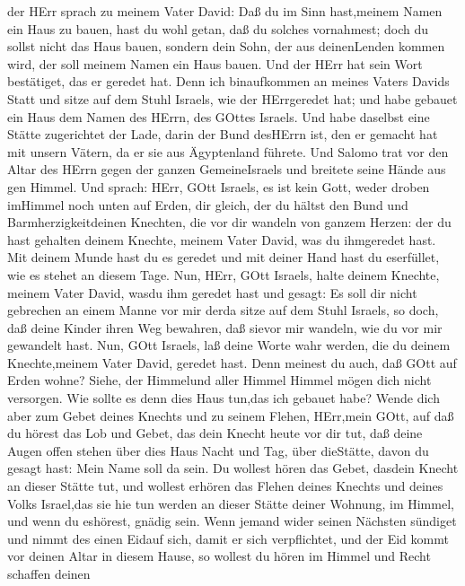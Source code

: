 der HErr sprach zu meinem Vater David: Daß du im Sinn hast,meinem Namen
ein Haus zu bauen, hast du wohl getan, daß du solches vornahmest;
 doch du sollst nicht das Haus bauen, sondern dein Sohn,
der aus deinenLenden kommen wird, der soll meinem Namen ein Haus bauen.
 Und der HErr hat sein Wort bestätiget, das er geredet hat.
Denn ich binaufkommen an meines Vaters Davids Statt und sitze auf dem
Stuhl Israels, wie der HErrgeredet hat; und habe gebauet ein Haus dem
Namen des HErrn, des GOttes Israels.  Und habe daselbst
eine Stätte zugerichtet der Lade, darin der Bund desHErrn ist, den er
gemacht hat mit unsern Vätern, da er sie aus Ägyptenland führete.
 Und Salomo trat vor den Altar des HErrn gegen der ganzen
GemeineIsraels und breitete seine Hände aus gen Himmel. 
Und sprach: HErr, GOtt Israels, es ist kein Gott, weder droben imHimmel
noch unten auf Erden, dir gleich, der du hältst den Bund und
Barmherzigkeitdeinen Knechten, die vor dir wandeln von ganzem Herzen:
 der du hast gehalten deinem Knechte, meinem Vater David,
was du ihmgeredet hast. Mit deinem Munde hast du es geredet und mit
deiner Hand hast du eserfüllet, wie es stehet an diesem Tage.
 Nun, HErr, GOtt Israels, halte deinem Knechte, meinem
Vater David, wasdu ihm geredet hast und gesagt: Es soll dir nicht
gebrechen an einem Manne vor mir derda sitze auf dem Stuhl Israels, so
doch, daß deine Kinder ihren Weg bewahren, daß sievor mir wandeln, wie
du vor mir gewandelt hast.  Nun, GOtt Israels, laß deine
Worte wahr werden, die du deinem Knechte,meinem Vater David, geredet
hast.  Denn meinest du auch, daß GOtt auf Erden wohne?
Siehe, der Himmelund aller Himmel Himmel mögen dich nicht versorgen. Wie
sollte es denn dies Haus tun,das ich gebauet habe?  Wende
dich aber zum Gebet deines Knechts und zu seinem Flehen, HErr,mein GOtt,
auf daß du hörest das Lob und Gebet, das dein Knecht heute vor dir tut,
 daß deine Augen offen stehen über dies Haus Nacht und Tag,
über dieStätte, davon du gesagt hast: Mein Name soll da sein. Du wollest
hören das Gebet, dasdein Knecht an dieser Stätte tut,  und
wollest erhören das Flehen deines Knechts und deines Volks Israel,das
sie hie tun werden an dieser Stätte deiner Wohnung, im Himmel, und wenn
du eshörest, gnädig sein.  Wenn jemand wider seinen
Nächsten sündiget und nimmt des einen Eidauf sich, damit er sich
verpflichtet, und der Eid kommt vor deinen Altar in diesem Hause,
 so wollest du hören im Himmel und Recht schaffen deinen
